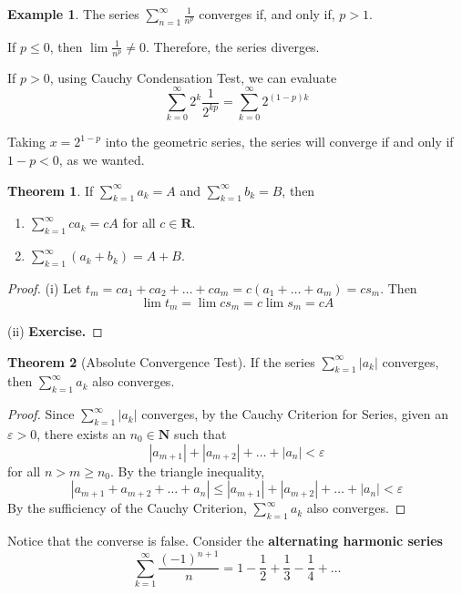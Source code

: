 \documentclass[12pt,a4paper]{article}
\theoremstyle{definition}
\newtheorem{theorem}{Theorem}[section]
\newtheorem{example}{Example}[section]
\begin{document}
\begin{example}
	The series $\sum_{n=1}^\infty \frac{1}{n^p}$ converges if, and only if, $p > 1$.
	
	If $p \leq 0$, then $\lim \frac{1}{n^p} \neq 0$. Therefore, the series diverges.
	
	If $p > 0$, using Cauchy Condensation Test, we can evaluate
	\[
		\sum_{k=0}^\infty 2^k \frac{1}{2^{kp}} = \sum_{k=0}^\infty 2^{(1-p)k}
	\]
	
	Taking $x = 2^{1-p}$ into the geometric series, the series will converge if and only if $1-p < 0$, as we wanted.
\end{example}

\begin{theorem}
	If $\sum_{k=1}^\infty a_k = A$ and $\sum_{k=1}^\infty b_k = B$, then
	\begin{enumerate}
		\item[(i)] $\sum_{k=1}^\infty c a_k = c A$ for all $c \in \textbf{R}$.
		\item[(ii)] $\sum_{k=1}^\infty (a_k + b_k) = A + B$.
	\end{enumerate}
\end{theorem}

\begin{proof}
	(i) Let $t_m = c a_1 + c a_2 + \ldots + c a_m = c (a_1 + \ldots + a_m) = c s_m$. Then \[ \lim t_m = \lim c s_m = c \lim s_m = c A \]
	
	(ii) \textbf{Exercise.}
\end{proof}

\begin{theorem}[Absolute Convergence Test]
	If the series $\sum_{k=1}^\infty |a_k|$ converges, then $\sum_{k=1}^\infty a_k$ also converges.
\end{theorem}

\begin{proof}
	Since $\sum_{k=1}^\infty |a_k|$ converges, by the Cauchy Criterion for Series, given an $\varepsilon > 0$, there exists an $n_0 \in \textbf{N}$ such that
	\[
		|a_{m+1}| + |a_{m+2}| + \ldots + |a_n| < \varepsilon
	\]
	for all $n > m \geq n_0$. By the triangle inequality,
	\[
		|a_{m+1} + a_{m+2} + \ldots + a_n| \leq |a_{m+1}| + |a_{m+2}| + \ldots + |a_n| < \varepsilon
	\]
	By the sufficiency of the Cauchy Criterion, $\sum_{k=1}^\infty a_k$ also converges.
\end{proof}

Notice that the converse is false. Consider the \textbf{alternating harmonic series}
\[
	\sum_{k=1}^\infty \frac{(-1)^{n+1}}{n} = 1 - \frac{1}{2} + \frac{1}{3} - \frac{1}{4} + \ldots
\]
\end{document}
